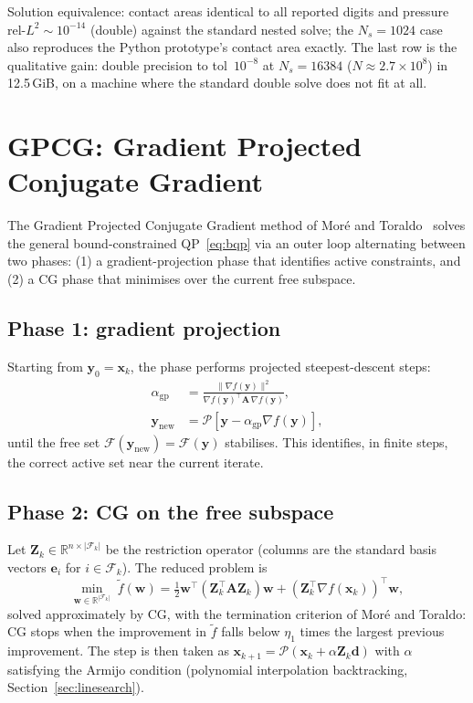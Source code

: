 \documentclass[11pt,a4paper]{article}
\newcommand{\R}{\mathbb{R}}
\newcommand{\bA}{\mathbf{A}}
\newcommand{\bd}{\mathbf{d}}
\newcommand{\bw}{\mathbf{w}}
\newcommand{\bx}{\mathbf{x}}
\newcommand{\by}{\mathbf{y}}
\newcommand{\bZ}{\mathbf{Z}}
\newcommand{\be}{\mathbf{e}}
\newcommand{\Proj}{\mathcal{P}}
\newcommand{\calF}{\mathcal{F}}
\newcommand{\norm}[1]{\|#1\|}
\newcommand{\tr}{\top}
\begin{document}
\noindent
Solution equivalence: contact areas identical to all reported digits and
pressure rel-$L^2 \sim 10^{-14}$ (double) against the standard nested solve;
the $N_s = 1024$ case also reproduces the Python prototype's contact area
exactly.  The last row is the qualitative gain: double precision to
tol~$10^{-8}$ at $N_s = 16384$ ($N \approx 2.7\times10^{8}$) in
12.5\,GiB, on a machine where the standard double solve does not fit at all.

\section{GPCG: Gradient Projected Conjugate Gradient}
\label{sec:gpcg}

The Gradient Projected Conjugate Gradient method of Mor\'e and
Toraldo~\cite{MoreToraldo1991} solves the general bound-constrained
QP~\eqref{eq:bqp} via an outer loop alternating between two phases:
(1) a gradient-projection phase that identifies active constraints, and
(2) a CG phase that minimises over the current free subspace.

\subsection{Phase 1: gradient projection}

Starting from $\by_0 = \bx_k$, the phase performs projected steepest-descent steps:
\begin{align}
  \alpha_{\mathrm{gp}} &= \frac{\norm{\nabla f(\by)}^2}{\nabla f(\by)^\tr \bA\,\nabla f(\by)},
  \label{eq:gp-step}\\[4pt]
  \by_{\mathrm{new}}   &= \Proj[\by - \alpha_{\mathrm{gp}}\nabla f(\by)],
\end{align}
until the free set $\calF(\by_{\mathrm{new}}) = \calF(\by)$ stabilises.
This identifies, in finite steps, the correct active set near the current iterate.

\subsection{Phase 2: CG on the free subspace}

Let $\bZ_k \in \R^{n \times |\calF_k|}$ be the restriction operator (columns are
the standard basis vectors $\be_i$ for $i \in \calF_k$).
The reduced problem is
\begin{equation}
  \min_{\bw \in \R^{|\calF_k|}}\; \tilde f(\bw)
  = \tfrac{1}{2}\bw^\tr(\bZ_k^\tr\bA\bZ_k)\bw
    + (\bZ_k^\tr\nabla f(\bx_k))^\tr\bw,
  \label{eq:reduced}
\end{equation}
solved approximately by CG, with the termination criterion of
Mor\'e and Toraldo: CG stops when the improvement in $\tilde f$
falls below $\eta_1$ times the largest previous improvement.
The step is then taken as
$\bx_{k+1} = \Proj(\bx_k + \alpha\bZ_k\bd)$
with $\alpha$ satisfying the Armijo condition (polynomial interpolation
backtracking, Section~\ref{sec:linesearch}).
\end{document}
